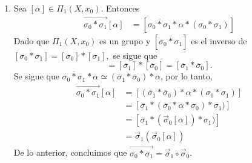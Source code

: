 \begin{demostracion}
\begin{enumerate}[label=(\arabic*)]
    \item Sea $[\alpha]\in \Pi_1(X,x_0)$. Entonces
    \begin{align*}
        \overrightarrow{\sigma_0*\sigma_1}[\alpha]&=[\overline{\sigma_0*\sigma_1}*\alpha*(\sigma_0*\sigma_1)]
    \end{align*}
    Dado que $\Pi_1(X,x_0)$ es un grupo y $[\overline{\sigma_0*\sigma_1}]$ es el inverso de $[\sigma_0*\sigma_1]=[\sigma_0]*[\sigma_1],$ se sigue que 
    \begin{equation*}
        [\overline{\sigma_0*\sigma_1}]=[\overline{\sigma}_1]*[\overline{\sigma}_0]=
        [\overline{\sigma}_1*\overline{\sigma}_0].
    \end{equation*}
    Se sigue que $\overline{\sigma_0*\sigma_1}*\alpha\simeq (\overline{\sigma}_1*\overline{\sigma}_0)*\alpha$, por lo tanto,
    \begin{align*}
        \overrightarrow{\sigma_0*\sigma_1}[\alpha]&=[(\overline{\sigma}_1*\overline{\sigma}_0)*\alpha*(\sigma_0*\sigma_1)]\\
        &=[\overline{\sigma}_1*(\overline{\sigma}_0*\alpha*\sigma_0)*\sigma_1)]\\
        &=[\overline{\sigma}_1*(\Vec{\sigma}_0[\alpha])*\sigma_1)]\\
        &=\Vec{\sigma}_1(\Vec{\sigma}_0[\alpha])
    \end{align*}
    De lo anterior, concluimos que $\overrightarrow{\sigma_0*\sigma_1}=\Vec{\sigma}_1\circ \Vec{\sigma}_0$.
\end{enumerate}
\end{demostracion}
